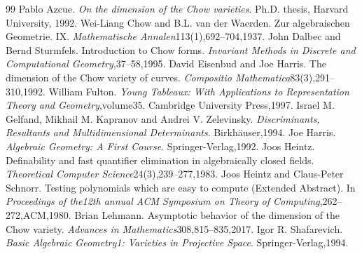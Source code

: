 \documentclass[10pt,a4paper]{article}
\begin{document}
\begin{thebibliography}{99}
 Pablo Azcue. \emph{On the dimension of the Chow varieties}. Ph.D. thesis, Harvard University, 1992.
 Wei-Liang Chow and B.L. van der Waerden. Zur algebraischen Geometrie. IX. \emph{Mathematische Annalen}113(1),692--704,1937.
 John Dalbec and Bernd Sturmfels. Introduction to Chow forms. \emph{Invariant Methods in Discrete and Computational Geometry},37--58,1995.
 David Eisenbud and Joe Harris. The dimension of the Chow variety of curves. \emph{Compositio Mathematica}83(3),291--310,1992.
 William Fulton. \emph{Young Tableaux: With Applications to Representation Theory and Geometry},volume35. Cambridge University Press,1997.
 Israel M. Gelfand, Mikhail M. Kapranov and Andrei V. Zelevinsky. \emph{Discriminants, Resultants and Multidimensional Determinants}. Birkh\"auser,1994.
 Joe Harris. \emph{Algebraic Geometry: A First Course}. Springer-Verlag,1992.
 Joos Heintz. Definability and fast quantifier elimination in algebraically closed fields. \emph{Theoretical Computer Science}24(3),239--277,1983.
 Joos Heintz and Claus-Peter Schnorr. Testing polynomials which are easy to compute (Extended Abstract). In \emph{Proceedings of the12th annual ACM Symposium on Theory of Computing},262--272,ACM,1980.
 Brian Lehmann. Asymptotic behavior of the dimension of the Chow variety. \emph{Advances in Mathematics}308,815--835,2017.
 Igor R. Shafarevich. \emph{Basic Algebraic Geometry1: Varieties in Projective Space}. Springer-Verlag,1994.
\end{thebibliography}
\end{document}
